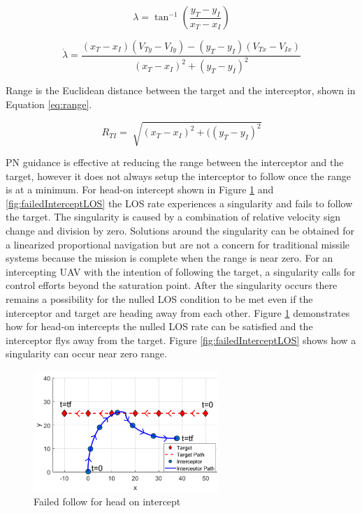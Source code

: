 \documentclass[conference]{IEEEtran}
\begin{document}
\begin{equation} \label{eq:LOS}
\lambda = \tan^{-1} \left(\frac{y_T - y_I}{x_T - x_I}\right)
\end{equation} 

\begin{equation} \label{eq:losrate}
\dot{\lambda} = \frac{(x_T - x_I)(V_{Ty}-V_{Iy}) - (y_T - y_I)(V_{Tx}-V_{Ix})}{(x_T - x_I)^2+(y_T - y_I)^2}
\end{equation}




Range is the Euclidean distance between the target and the interceptor, shown in Equation \ref{eq:range}. 

\begin{equation} \label{eq:range}
R_{TI} =\sqrt[]{(x_T - x_I)^2+((y_T - y_I)^2}
\end{equation}


 


PN guidance is effective at reducing the range between the interceptor and the target, however it does not always setup the interceptor to follow once the range is at a minimum. For head-on intercept shown in Figure \ref{fig:failedIntercept} and \ref{fig:failedInterceptLOS} the LOS rate experiences a singularity and fails to follow the target. The singularity is caused by a combination of relative velocity sign change and division by zero. Solutions around the singularity can be obtained for a linearized proportional navigation \cite{singularitySolution} but are not a concern for traditional missile systems because the mission is complete when the range is near zero. For an intercepting UAV with the intention of following the target, a singularity  calls for control efforts beyond the saturation point. After the singularity occurs there remains a possibility for the nulled LOS condition to be met even if the interceptor and target are heading away from each other. Figure \ref{fig:failedIntercept} demonstrates how for head-on intercepts the nulled LOS rate can be satisfied and the interceptor flys away from the target. Figure \ref{fig:failedInterceptLOS} shows how a singularity can occur near zero range.




\begin{figure}[H]
	\centering
	\includegraphics[width=7cm] {failedHeadOn}
	\caption{Failed follow for head on intercept}
	\label{fig:failedIntercept}
	\hspace*{0mm}
\end{figure}
\end{document}
